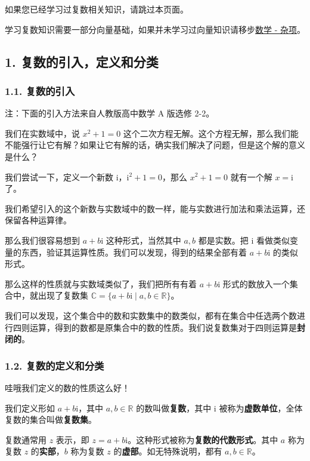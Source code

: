 
如果您已经学习过复数相关知识，请跳过本页面。

学习复数知识需要一部分向量基础，如果并未学习过向量知识请移步\href{/math/misc/}{数学 - 杂项}。

\subsection{1. 复数的引入，定义和分类}

\subsubsection{1.1. 复数的引入}

注：下面的引入方法来自人教版高中数学 A 版选修 2-2。

我们在实数域中，说 $x^2+1=0$ 这个二次方程无解。这个方程无解，那么我们能不能强行让它有解？如果让它有解的话，确实我们解决了问题，但是这个解的意义是什么？

我们尝试一下，定义一个新数 $\text{i}$，$\text{i}^2+1=0$，那么 $x^2+1=0$ 就有一个解 $x=\text{i}$ 了。

我们希望引入的这个新数与实数域中的数一样，能与实数进行加法和乘法运算，还保留各种运算律。

那么我们很容易想到 $a+b\text{i}$ 这种形式，当然其中 $a,b$ 都是实数。把 $\text{i}$ 看做类似变量的东西，验证其运算性质。我们可以发现，得到的结果全部有着 $a+b\text{i}$ 的类似形式。

那么这样的性质就与实数域类似了，我们把所有有着 $a+b\text{i}$ 形式的数放入一个集合中，就出现了复数集 $\mathbb{C}=\{a+b\text{i} \mid a,b\in \mathbb{R}\}$。

我们可以发现，这个集合中的数和实数集中的数类似，都有在集合中任选两个数进行四则运算，得到的数都是原集合中的数的性质。我们说复数集对于四则运算是\textbf{封闭的}。

\subsubsection{1.2. 复数的定义和分类}

\begin{QUOTE}{}{}
哇哦我们定义的数的性质这么好！
\end{QUOTE}

我们定义形如 $a+b\text{i}$，其中 $a,b\in \mathbb{R}$ 的数叫做\textbf{复数}，其中 $\text{i}$ 被称为\textbf{虚数单位}，全体复数的集合叫做\textbf{复数集}。

复数通常用 $z$ 表示，即 $z=a+b\text{i}$。这种形式被称为\textbf{复数的代数形式}。其中 $a$ 称为复数 $z$ 的\textbf{实部}，$b$ 称为复数 $z$ 的\textbf{虚部}。如无特殊说明，都有 $a,b\in \mathbb{R}$。


